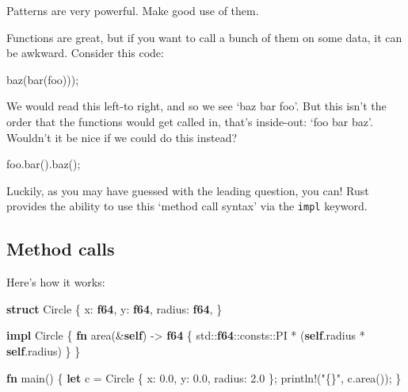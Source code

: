 \documentclass[a4paper,]{book}
\newenvironment{Shaded}{\begin{snugshade}}{\end{snugshade}}
\newcommand{\KeywordTok}[1]{\textcolor[rgb]{0.13,0.29,0.53}{\textbf{{#1}}}}
\newcommand{\DecValTok}[1]{\textcolor[rgb]{0.00,0.00,0.81}{{#1}}}
\newcommand{\StringTok}[1]{\textcolor[rgb]{0.31,0.60,0.02}{{#1}}}
\newcommand{\OtherTok}[1]{\textcolor[rgb]{0.56,0.35,0.01}{{#1}}}
\newcommand{\NormalTok}[1]{{#1}}
\begin{document}
Patterns are very powerful. Make good use of them.


Functions are great, but if you want to call a bunch of them on some
data, it can be awkward. Consider this code:

\begin{Shaded}
\begin{Highlighting}[]
\NormalTok{baz(bar(foo)));}
\end{Highlighting}
\end{Shaded}

We would read this left-to right, and so we see `baz bar foo'. But this
isn't the order that the functions would get called in, that's
inside-out: `foo bar baz'. Wouldn't it be nice if we could do this
instead?

\begin{Shaded}
\begin{Highlighting}[]
\NormalTok{foo.bar().baz();}
\end{Highlighting}
\end{Shaded}

Luckily, as you may have guessed with the leading question, you can!
Rust provides the ability to use this `method call syntax' via the
\texttt{impl} keyword.

\subsection{Method calls}\label{method-calls}

Here's how it works:

\begin{Shaded}
\begin{Highlighting}[]
\KeywordTok{struct} \NormalTok{Circle \{}
    \NormalTok{x: }\KeywordTok{f64}\NormalTok{,}
    \NormalTok{y: }\KeywordTok{f64}\NormalTok{,}
    \NormalTok{radius: }\KeywordTok{f64}\NormalTok{,}
\NormalTok{\}}

\KeywordTok{impl} \NormalTok{Circle \{}
    \KeywordTok{fn} \NormalTok{area(&}\KeywordTok{self}\NormalTok{) -> }\KeywordTok{f64} \NormalTok{\{}
        \NormalTok{std::}\KeywordTok{f64}\NormalTok{::consts::PI * (}\KeywordTok{self}\NormalTok{.radius * }\KeywordTok{self}\NormalTok{.radius)}
    \NormalTok{\}}
\NormalTok{\}}

\KeywordTok{fn} \NormalTok{main() \{}
    \KeywordTok{let} \NormalTok{c = Circle \{ x: }\DecValTok{0.0}\NormalTok{, y: }\DecValTok{0.0}\NormalTok{, radius: }\DecValTok{2.0} \NormalTok{\};}
    \OtherTok{println!}\NormalTok{(}\StringTok{"\{\}"}\NormalTok{, c.area());}
\NormalTok{\}}
\end{Highlighting}
\end{Shaded}
\end{document}
